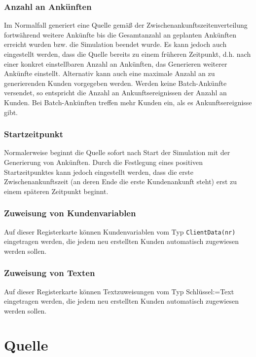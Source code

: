 \subsubsection*{Anzahl an Ankünften}

Im Normalfall generiert eine Quelle gemäß der Zwischenankunftszeitenverteilung fortwährend
weitere Ankünfte bis die Gesamtanzahl an geplanten Ankünften erreicht wurden bzw. die Simulation beendet wurde.
Es kann jedoch auch eingestellt werden, dass die Quelle bereits zu einem früheren Zeitpunkt,
d.h. nach einer konkret einstellbaren Anzahl an Ankünften, das Generieren weiterer Ankünfte einstellt.
Alternativ kann auch eine maximale Anzahl an zu generierenden Kunden vorgegeben werden.
Werden keine Batch-Ankünfte versendet, so entspricht die Anzahl an Ankunftsereignissen der
Anzahl an Kunden. Bei Batch-Ankünften treffen mehr Kunden ein, als es Ankunftsereignisse gibt.

\subsubsection*{Startzeitpunkt}

Normalerweise beginnt die Quelle sofort nach Start der Simulation mit der Generierung von
Ankünften. Durch die Festlegung eines positiven Startzeitpunktes kann jedoch eingestellt
werden, dass die erste Zwischenankunftszeit (an deren Ende die erste Kundenankunft steht) erst
zu einem späteren Zeitpunkt beginnt.

\subsubsection*{Zuweisung von Kundenvariablen}

Auf dieser Registerkarte können Kundenvariablen vom Typ \texttt{ClientData(nr)} eingetragen werden,
die jedem neu erstellten Kunden automatisch zugewiesen werden sollen.

\subsubsection*{Zuweisung von Texten}

Auf dieser Registerkarte können Textzuweisungen vom Typ Schlüssel:=Text eingetragen werden,
die jedem neu erstellten Kunden automatisch zugewiesen werden sollen.


\section{Quelle}
\label{ref:ModelElementSource}

